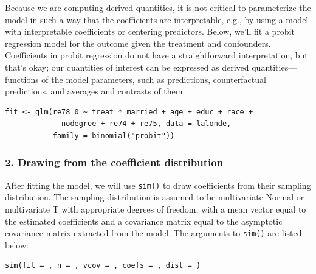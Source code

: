 Because we are computing derived quantities, it is not critical to parameterize the model in such a way that the coefficients are interpretable, e.g., by using a model with interpretable coefficients or centering predictors. Below, we'll fit a probit regression model for the outcome given the treatment and confounders. Coefficients in probit regression do not have a straightforward interpretation, but that's okay; our quantities of interest can be expressed as derived quantities---functions of the model parameters, such as predictions, counterfactual predictions, and averages and contrasts of them.

\begin{verbatim}
fit <- glm(re78_0 ~ treat * married + age + educ + race +
             nodegree + re74 + re75, data = lalonde,
           family = binomial("probit"))
\end{verbatim}

\hypertarget{drawing-from-the-coefficient-distribution}{%
\subsubsection{2. Drawing from the coefficient distribution}\label{drawing-from-the-coefficient-distribution}}

After fitting the model, we will use \texttt{sim()} to draw coefficients from their sampling distribution. The sampling distribution is assumed to be multivariate Normal or multivariate T with appropriate degrees of freedom, with a mean vector equal to the estimated coefficients and a covariance matrix equal to the asymptotic covariance matrix extracted from the model. The arguments to \texttt{sim()} are listed below:

\begin{verbatim}
sim(fit = , n = , vcov = , coefs = , dist = )
\end{verbatim}

